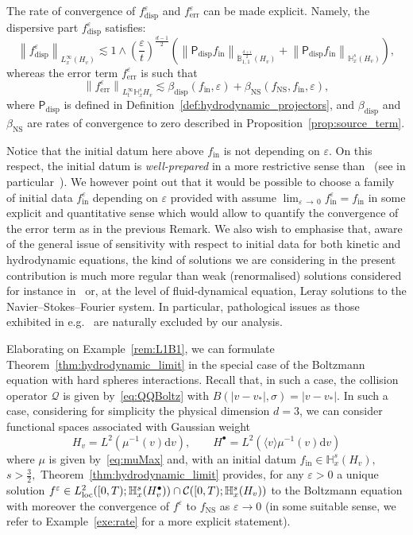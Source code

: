 \documentclass[AHL,Unicode,longabstracts,published]{cedram}
\newcommand{\ini}{\mathrm{in}}
\newcommand{\err}{\mathrm{err}}
\newcommand{\ns}{\mathrm{NS}}
\renewcommand{\d}{\mathrm{d}}
\newcommand{\disp}{\mathrm{disp}}
\newcommand{\bbH}{\mathbb{H}}
\newcommand{\bbB}{\mathbb{B}}
\newcommand{\CC}{\mathcal{C}}
\newcommand{\PP}{\mathsf{P}}
\newcommand{\QQ}{\mathcal{Q}}
\newcommand{\Ss}{H}
\newcommand{\Ssp}{H^{\bullet}}
\newcommand*\eps{{\varepsilon}}
\newcommand{\la}{\langle}
\newcommand{\ra}{\rangle}
\newcommand*{\MK}{\mkern 2mu}
\begin{document}
\begin{rema}
The rate of convergence of $f^\eps_\disp$ and $f^\eps_\err$ can be made explicit. Namely, the dispersive part $f^\eps_\disp$ satisfies:
\[
\left\| f^\eps_\disp \right\|_{L^\infty_x \left(\Ss_v \right) } \lesssim 1 \land \left(\frac{\eps}{t} \right)^{ \frac{d-1}{2} } \left(\left\| \PP_\disp f_\ini \right\|_{ \dot{\bbB}^{\frac{d+1}{2}}_{1,1} \left(\Ss_v \right) } + \left\| \PP_\disp f_\ini \right\|_{ \bbH^s_x (\Ss_v) } \right),
\]
whereas the error term $f^\eps_\err$ is such that
\[
\left\| f^\eps_\err \right\|_{ L^\infty_t \bbH^s_x \Ss_v } \lesssim {\beta_{\disp}}(f_\ini, \eps) + \beta_\ns(f_\ns, f_\ini, \eps),
\]
where ${\PP_\disp}$ is defined in Definition~\ref{def:hydrodynamic_projectors}, and ${\beta_{\disp}}$ and $\beta_\ns$ are rates of convergence to zero described in Proposition~\ref{prop:source_term}.
\end{rema}
\begin{rema}
Notice that the initial datum here above $f_\ini$ is not depending on $\eps$. On this respect, the initial datum is \emph{well-prepared} in a more restrictive sense than~\cite{BU1991} (see in particular~\cite[Remark~1.5$\MK$(ii)]{BU1991}). We however point out that it would be possible to choose a family of initial data $f_\ini^{\eps}$ depending on $\eps$ provided with assume $\lim_{\eps\,\to\,0}f_{\ini}^{\eps}=f_\ini$ in some explicit and quantitative sense which would allow to quantify the convergence of the error term as in the previous Remark. We also wish to emphasise that, aware of the general issue of sensitivity with respect to initial data for both kinetic and hydrodynamic equations, the kind of solutions we are considering in the present contribution is much more regular than weak (renormalised) solutions considered for instance in~\cite{golseSR,golseSR1} or, at the level of fluid-dynamical equation, Leray solutions to the Navier--Stokes--Fourier system. In particular, pathological issues as those exhibited in e.g.~\cite{albri,delellis} are naturally excluded by our analysis.
\end{rema}

\begin{exem}\label{exa:L1B1}
Elaborating on Example~\ref{rem:L1B1}, we can formulate Theorem~\ref{thm:hydrodynamic_limit} in the special case of the Boltzmann equation with hard spheres interactions. Recall that, in such a case, the collision operator $\QQ$ is given by~\eqref{eq:QQBoltz} with $B(|v-v_{*}|,\sigma)=|v-v_{*}|.$ In such a case, considering for simplicity the physical dimension $d=3$, we can consider functional spaces associated with Gaussian weight
\[
H_{v}=L^{2}\left(\mu^{-1}(v)\d v\right), \qquad \Ssp=L^2\left(\la v\ra \mu^{-1}(v)\d v\right)
\]
where $\mu$ is given by~\eqref{eq:muMax} and, with an initial datum $f_\ini \in\bbH^s_x (\Ss_v ),$ $s >\frac{3}{2},$ Theorem~\ref{thm:hydrodynamic_limit} provides, for any $\eps >0$ a unique solution $f^\eps \in L^2_{\rm{loc}} ([0, T) ; \bbH^s_x (\Ssp_v)) \cap \CC([0,T);\bbH^s_x(\Ss_v))$ to the Boltzmann equation with moreover the convergence of $f^{\eps}$ to $f_\ns$ as $\eps \to 0$ (in some suitable sense, we refer to Example~\ref{exe:rate} for a more explicit statement).
\end{exem}
\end{document}
